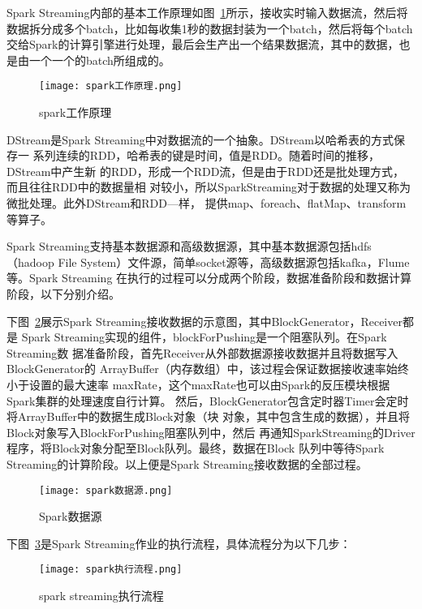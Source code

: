 Spark Streaming内部的基本工作原理如图~\ref{fig:spark工作原理}所示，接收实时输入数据流，然后将数据拆分成多个batch，比如每收集1秒的数据封装为一个batch，然后将每个batch交给Spark的计算引擎进行处理，最后会生产出一个结果数据流，其中的数据，也是由一个一个的batch所组成的。

\begin{figure}
    \centering
    \texttt{[image: spark工作原理.png]}
    \caption{spark工作原理}
    \label{fig:spark工作原理}
  \end{figure}

DStream是Spark Streaming中对数据流的一个抽象。DStream以哈希表的方式保存一
系列连续的RDD，哈希表的键是时间，值是RDD。随着时间的推移，DStream中产生新
的RDD，形成一个RDD流，但是由于RDD还是批处理方式，而且往往RDD中的数据量相
对较小，所以SparkStreaming对于数据的处理又称为微批处理。此外DStream和RDD—样，
提供map、foreach、flatMap、transform等算子。

Spark Streaming支持基本数据源和高级数据源，其中基本数据源包括hdfs（hadoop File System）文件源，简单socket源等，高级数据源包括kafka，Flume等。Spark Streaming
在执行的过程可以分成两个阶段，数据准备阶段和数据计算阶段，以下分别介绍。

下图~\ref{fig:spark}展示Spark Streaming接收数据的示意图，其中BlockGenerator，Receiver都是
Spark Streaming实现的组件，blockForPushing是一个阻塞队列。在Spark Streaming数
据准备阶段，首先Receiver从外部数据源接收数据并且将数据写入BlockGenerator的
ArrayBuffer（内存数组）中，该过程会保证数据接收速率始终小于设置的最大速率
maxRate，这个maxRate也可以由Spark的反压模块根据Spark集群的处理速度自行计算。
然后，BlockGenerator包含定时器Timer会定时将ArrayBuffer中的数据生成Block对象（块
对象，其中包含生成的数据），并且将Block对象写入BlockForPushing阻塞队列中，然后
再通知SparkStreaming的Driver程序，将Block对象分配至Block队列。最终，数据在Block
队列中等待Spark Streaming的计算阶段。以上便是Spark Streaming接收数据的全部过程。
\begin{figure}
    \centering
    \texttt{[image: spark数据源.png]}
    \caption{Spark数据源}
    \label{fig:spark}
  \end{figure}

  下图~\ref{fig:spark streaming}是Spark Streaming作业的执行流程，具体流程分为以下几步：
  \begin{figure}
    \centering
    \texttt{[image: spark执行流程.png]}
    \caption{spark streaming执行流程}
    \label{fig:spark streaming}
  \end{figure}
 
